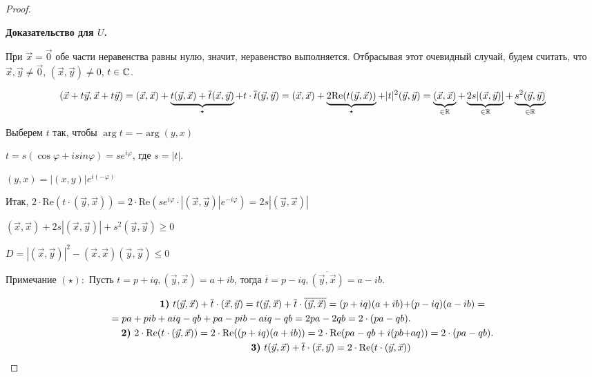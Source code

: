 \begin{proof}~

    \textbf{Доказательство для $U$.}
    
    При $\vec{x} = \vec{0}$ обе части неравенства равны нулю, значит, неравенство выполняется. Отбрасывая этот очевидный случай, будем считать, что $\vec{x}, \vec{y} \ne \vec{0}$, $(\vec{x}, \vec{y}) \ne 0$, $t \in \mathbb{C}$.
    
    $$(\vec{x} + t\vec{y}, \vec{x} + t\vec{y}) = (\vec{x}, \vec{x}) + \underbrace{t(\vec{y}, \vec{x}) + \overline{t}(\vec{x}, \vec{y})}_{\star} + t \cdot \overline{t}(\vec{y}, \vec{y}) = (\vec{x}, \vec{x}) + \underbrace{2 \text{Re}(t(\vec{y}, \vec{x}))}_{\star} + |t|^2(\vec{y}, \vec{y}) = \underbrace{(\vec{x}, \vec{x})}_{\in \mathbb{R}} + \underbrace{2s|(\vec{x}, \vec{y})|}_{\in \mathbb{R}} + \underbrace{s^2(\vec{y}, \vec{y})}_{\in \mathbb{R}}$$

    Выберем $t$ так, чтобы $\arg{t} = -\arg{(y, x)}$

    $t = s(\cos \varphi + isin\varphi) = se^{i\varphi}$, где $s = |t|$.

    $(y, x) = |(x, y)|e^{i(-\varphi)}$

    Итак, $2 \cdot \text{Re} (t \cdot (\vec{y}, \vec{x})) = 2 \cdot \text{Re} (se^{i\varphi} \cdot |(\vec{x}, \vec{y})|e^{-i\varphi}) = 2s|(\vec{y}, \vec{x})|$

    $(\vec{x}, \vec{x}) + 2s|(\vec{x}, \vec{y})| + s^2(\vec{y}, \vec{y}) \geq 0$

    $D = |(\vec{x}, \vec{y})|^2 - (\vec{x}, \vec{x})(\vec{y}, \vec{y}) \leq 0$


    \bigbreak
    
    $\text{Примечание } (\star) \colon$ Пусть $t = p + iq, (\vec{y}, \vec{x}) = a + ib$, тогда $\overline{t} = p - iq, \overline{(\vec{y}, \vec{x})} = a - ib$. 
    
    \begin{align*}
        \text{\textbf{1)} } t(\vec{y}, \vec{x}) + \overline{t} \cdot (\vec{x}, \vec{y}) = t(\vec{y}, \vec{x}) + \overline{t} \cdot \overline{(\vec{y}, \vec{x})} = (p + iq)(a + ib) + &(p - iq)(a - ib) = \\ = pa + pib + aiq - qb + pa - pib - aiq - qb = 2pa - 2qb = 2 \cdot (pa - qb).\\
        \text{\textbf{2)} } 2 \cdot \text{Re} (t \cdot (\vec{y}, \vec{x})) = 2 \cdot \text{Re}((p + iq)(a + ib)) = 2 \cdot \text{Re}(pa - qb + i(pb +& aq)) = 2 \cdot (pa - qb).\\
        \text{\textbf{3)} } t(\vec{y}, \vec{x}) + \overline{t} \cdot (\vec{x}, \vec{y}) = 2 \cdot \text{Re} (t \cdot (\vec{y}, \vec{x}))
    \end{align*}
\end{proof}

